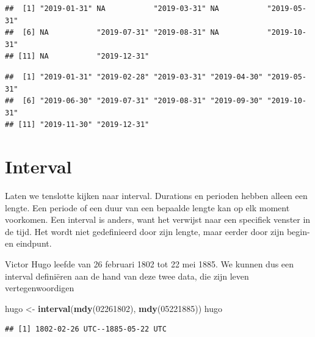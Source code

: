 \documentclass[]{tufte-book}
\newenvironment{Shaded}{}{}
\newcommand{\DecValTok}[1]{\textcolor[rgb]{0.25,0.63,0.44}{#1}}
\newcommand{\KeywordTok}[1]{\textcolor[rgb]{0.00,0.44,0.13}{\textbf{#1}}}
\newcommand{\NormalTok}[1]{#1}
\newcommand{\OperatorTok}[1]{\textcolor[rgb]{0.40,0.40,0.40}{#1}}
\newcommand{\StringTok}[1]{\textcolor[rgb]{0.25,0.44,0.63}{#1}}
\begin{document}
\begin{verbatim}
##  [1] "2019-01-31" NA           "2019-03-31" NA           "2019-05-31"
##  [6] NA           "2019-07-31" "2019-08-31" NA           "2019-10-31"
## [11] NA           "2019-12-31"
\end{verbatim}

\begin{Shaded}
\end{Shaded}

\begin{verbatim}
##  [1] "2019-01-31" "2019-02-28" "2019-03-31" "2019-04-30" "2019-05-31"
##  [6] "2019-06-30" "2019-07-31" "2019-08-31" "2019-09-30" "2019-10-31"
## [11] "2019-11-30" "2019-12-31"
\end{verbatim}

\hypertarget{interval-2}{%
\section{Interval}\label{interval-2}}

Laten we tenslotte kijken naar interval. Durations en perioden hebben alleen een lengte. Een periode of een duur van een bepaalde lengte kan op elk moment voorkomen.
Een interval is anders, want het verwijst naar een specifiek venster in de tijd. Het wordt niet gedefinieerd door zijn lengte, maar eerder door zijn begin- en eindpunt.

Victor Hugo leefde van 26 februari 1802 tot 22 mei 1885. We kunnen dus een interval definiëren aan de hand van deze twee data, die zijn leven vertegenwoordigen

\begin{Shaded}
\begin{Highlighting}[]
\NormalTok{hugo <-}\StringTok{ }\KeywordTok{interval}\NormalTok{(}\KeywordTok{mdy}\NormalTok{(}\DecValTok{02261802}\NormalTok{), }\KeywordTok{mdy}\NormalTok{(}\DecValTok{05221885}\NormalTok{))}
\NormalTok{hugo}
\end{Highlighting}
\end{Shaded}

\begin{verbatim}
## [1] 1802-02-26 UTC--1885-05-22 UTC
\end{verbatim}
\end{document}
